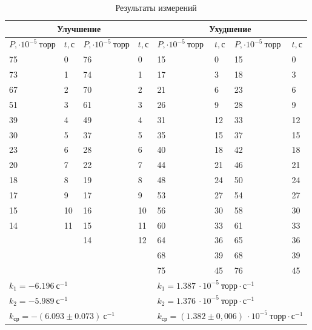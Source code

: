 \documentclass[a4paper,12pt]{article}
\begin{document}
\begin{table}[h!]
	\centering 
	\caption{Результаты измерений}
	\begin{tabular}{|l|l|l|l|l|l|l|l|} \hline 
		\multicolumn{4}{|c|}{Улучшение} & \multicolumn{4}{|c|}{Ухудшение} \\ \hline
		$P, \cdot 10^{-5}~ торр$ & $t, с$ &$P, \cdot 10^{-5}~ торр$ & $t, с$ &$P, \cdot 10^{-5}~ торр$ & $t, с$ &$P, \cdot 10^{-5}~ торр$ & $t, с$  \\ \hline
		75 & 0 & 76 & 0 & 15 & 0 & 15  & 0 \\ \hline 
		73 & 1 & 74 & 1 & 17 & 3 & 18 & 3 \\ \hline 
		67 & 2 & 70 & 2 & 21 & 6 & 23 & 6 \\ \hline 
		51 & 3 & 61 & 3 & 26 & 9 & 28 & 9 \\ \hline 
		39 & 4 & 49 & 4 & 31 & 12 & 33 & 12 \\ \hline 
		30 & 5 & 37 & 5 & 35 & 15 & 37 & 15 \\ \hline
		23 & 6 & 28 & 6 & 40 & 18 & 42 & 18\\ \hline 
		20 & 7 & 22 & 7 & 44 & 21 & 46 & 21 \\ \hline
		18 & 8 & 19 & 8 & 48 & 24 & 50 & 24 \\ \hline 
		17 & 9 & 17 & 9 & 53 & 27 & 54 & 27 \\ \hline
		15 & 10 & 16 & 10 & 56 & 30 & 58 & 30 \\ \hline 
		14 & 11 & 15 & 11 & 60 & 33 & 61 & 33 \\ \hline
		 &  & 14 & 12 & 64 & 36 & 65 &  36   \\ \hline
		 &  &  &  & 68 & 39 & 68 &  39     \\ \hline 
		 &  &  &  & 75 & 45 & 76  &  45     \\ \hline 
		\multicolumn{4}{|l|}{$k_1 = -6.196 ~  с^{-1}$} & \multicolumn{4}{|l|}{$k_1 = 1.387 ~ \cdot 10^{-5} ~торр \cdot с^{-1}$} \\ 
		
		\multicolumn{4}{|l|}{$k_2 = -5.989 ~ с^{-1}$}
		&\multicolumn{4}{|l|}{$k_2 = 1.376 ~ \cdot 10^{-5} ~торр \cdot с^{-1}$} \\ 
		
		
		\multicolumn{4}{|l|}{$k_{ср} = -(6.093 \pm 0.073) ~ с^{-1}$}
		&\multicolumn{4}{|l|}{$k_{ср} = (1.382\pm 0,006) ~ \cdot 10^{-5} ~ торр \cdot с^{-1}$} \\ 
		\hline
\end{tabular}
\end{table}
 
\end{document}

